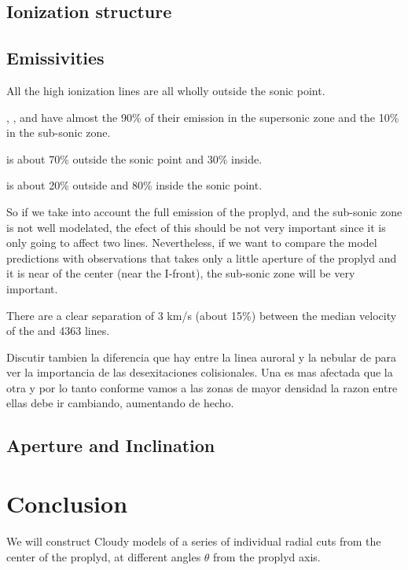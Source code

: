 \documentclass[aaspp]{article}
\begin{document}
\subsection{Ionization structure}
\label{sec:ionization}



\subsection{Emissivities}
\label{sec:emi}

All the high ionization lines are all wholly outside the sonic point.

\neii, \ha, \nii and \oii have almost the 90\% of their emission in the supersonic zone and the 10\% in the sub-sonic zone.

\sii is about 70\% outside the sonic point and 30\% inside.

\oi is about 20\% outside and 80\% inside the sonic point.

So if we take into account the full emission of the proplyd, and the sub-sonic zone is not well modelated, the efect of this should be not very important since it is only going to affect two lines. Nevertheless, if we want to compare the model predictions with observations that takes only a little aperture of the proplyd and it is near of the center (near the I-front), the sub-sonic zone will be very important.

There are a clear separation of 3 km/s (about 15\%) between the median velocity of the  and 4363 lines.

Discutir tambien la diferencia que hay entre la linea auroral y la nebular de \nii para ver la importancia de las desexitaciones colisionales. Una es mas afectada que la otra y por lo tanto conforme vamos a las zonas de mayor densidad la razon entre ellas debe ir cambiando, aumentando de hecho.

\subsection{Aperture and Inclination}
\label{sec:aperture}


\section{Conclusion}
\label{sec:conclusions}

We will construct Cloudy models of a series of individual radial cuts from the center of the proplyd, at different angles $\theta$ from the proplyd axis.




\end{document}
